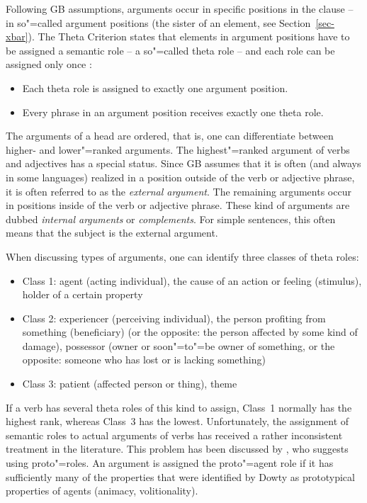 Following GB assumptions, arguments occur in specific positions in the clause -- in so"=called argument positions (\eg the sister of 
an \xnull element, see Section~\ref{sec-xbar}). The Theta Criterion states that elements in argument positions have to be assigned
a semantic role -- a so"=called theta role -- and
each role can be assigned only once \citep[]{Chomsky81a}: 
\begin{principle-break}\label{theta-Kriterium}
\begin{itemize}
\item Each theta role is assigned to exactly one argument position.
\item Every phrase in an argument position receives exactly one theta role.
\end{itemize}
\end{principle-break}
\noindent
The arguments of a head are ordered, that is, one can differentiate between higher- and lower"=ranked arguments. The highest"=ranked
argument of verbs and adjectives has a special status. Since GB assumes that it is often (and always in some languages) realized in a position
outside of the verb or adjective phrase, it is often referred to as the \emph{external argument}. The remaining
arguments occur in positions inside of the verb or adjective phrase. These kind of arguments are dubbed 
\emph{internal arguments} or \emph{complements}. For simple sentences, this often means that the subject
is the external argument.

\addlines[2]
When discussing types of arguments, one can identify three classes of theta roles:
\begin{itemize}
\item Class 1: agent (acting individual), the cause of an action or feeling (stimulus), holder of a certain property
\item Class 2: experiencer (perceiving individual), the person profiting from something (beneficiary)
(or the opposite: the person affected by some kind of damage), possessor (owner or soon"=to"=be owner of something, or the opposite:
someone who has lost or is lacking something) 
\item Class 3: patient (affected person or thing), theme
\end{itemize}
If a verb has several theta roles of this kind to assign, Class~1 normally has the highest rank, whereas Class~3 has the lowest.
Unfortunately, the assignment of semantic roles to actual arguments of verbs has received a rather inconsistent treatment in the 
literature. This problem has been discussed by \citet{Dowty91a}, who suggests using proto"=roles. An argument is assigned the
proto"=agent role if it has sufficiently many of the properties that were identified by Dowty as prototypical properties of agents (\eg animacy, volitionality).%
\nocite{Gruber65a-u,Fillmore68,Fillmore71a-u,Jackendoff72a-u,Dowty91a}


